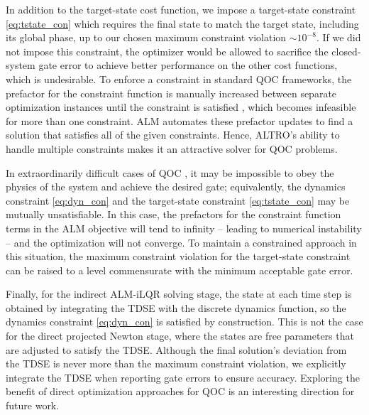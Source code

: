 In addition to the target-state cost function, we
impose a target-state constraint \eqref{eq:tstate_con} which  requires the final state to match the target state, including its global phase,
up to our chosen maximum constraint violation $\sim 10^{-8}$.
If we did not impose this constraint, the optimizer would be
allowed to sacrifice the closed-system gate error to achieve better
performance on the other cost functions, which is undesirable.
To enforce a constraint in standard QOC frameworks,
the prefactor for the constraint function is manually increased
between separate optimization instances until the constraint is satisfied
\cite{heeres2017implementing, leung2017speedup, reinhold2019controlling},
which becomes infeasible for more than one constraint.
ALM automates these prefactor updates to find
a solution that satisfies all of the given constraints.
Hence, ALTRO's ability to handle multiple constraints makes it
an attractive solver for QOC problems.

In extraordinarily difficult cases of
QOC \cite{abdelhafez2020universal}, it may be impossible
to obey the physics of the system and achieve the desired gate;
equivalently, the dynamics constraint \eqref{eq:dyn_con}
and the target-state constraint \eqref{eq:tstate_con} may be mutually unsatisfiable.
In this case, the prefactors for the constraint function terms
in the ALM objective will tend to infinity -- leading to numerical instability -- and the
optimization will not converge. To maintain a constrained approach in this situation,
the maximum constraint violation for the target-state constraint can be raised
to a level commensurate with the minimum acceptable gate error.

Finally, for the indirect ALM-iLQR solving stage,
the state at each time step is obtained by integrating
the TDSE with the discrete dynamics function,
so the dynamics constraint \eqref{eq:dyn_con} is satisfied by construction.
This is not the case for the direct projected Newton stage, where the states
are free parameters that are adjusted to satisfy the TDSE.
Although the final solution's deviation from the TDSE is never more than the maximum constraint violation,
we explicitly integrate the TDSE when reporting gate errors to ensure accuracy.
Exploring the benefit of direct optimization approaches for QOC is an interesting direction for future work.
